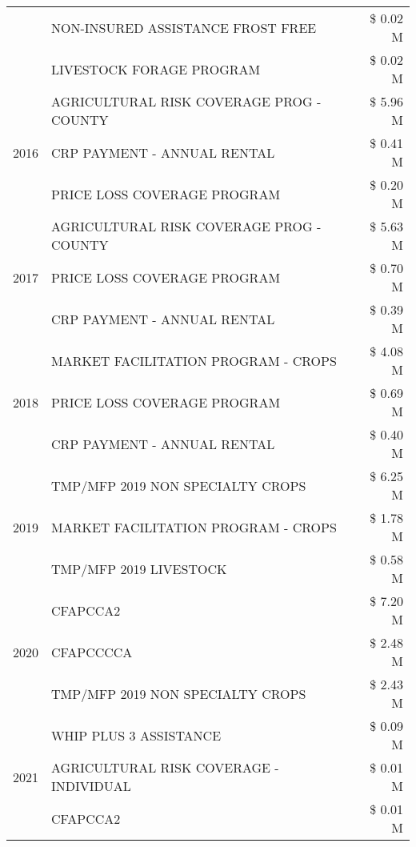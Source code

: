 \begin{tabular}{llr}
 & NON-INSURED ASSISTANCE FROST FREE & \$ 0.02 M \\
 & LIVESTOCK FORAGE PROGRAM & \$ 0.02 M \\
\cline{1-3}
\multirow[t]{3}{*}{2016} & AGRICULTURAL RISK COVERAGE PROG - COUNTY      & \$ 5.96 M \\
 & CRP PAYMENT - ANNUAL RENTAL                   & \$ 0.41 M \\
 & PRICE LOSS COVERAGE PROGRAM                   & \$ 0.20 M \\
\cline{1-3}
\multirow[t]{3}{*}{2017} & AGRICULTURAL RISK COVERAGE PROG - COUNTY & \$ 5.63 M \\
 & PRICE LOSS COVERAGE PROGRAM & \$ 0.70 M \\
 & CRP PAYMENT - ANNUAL RENTAL & \$ 0.39 M \\
\cline{1-3}
\multirow[t]{3}{*}{2018} & MARKET FACILITATION PROGRAM - CROPS & \$ 4.08 M \\
 & PRICE LOSS COVERAGE PROGRAM & \$ 0.69 M \\
 & CRP PAYMENT - ANNUAL RENTAL & \$ 0.40 M \\
\cline{1-3}
\multirow[t]{3}{*}{2019} & TMP/MFP 2019 NON SPECIALTY CROPS & \$ 6.25 M \\
 & MARKET FACILITATION PROGRAM - CROPS & \$ 1.78 M \\
 & TMP/MFP 2019 LIVESTOCK & \$ 0.58 M \\
\cline{1-3}
\multirow[t]{3}{*}{2020} & CFAPCCA2 & \$ 7.20 M \\
 & CFAPCCCCA & \$ 2.48 M \\
 & TMP/MFP 2019 NON SPECIALTY CROPS & \$ 2.43 M \\
\cline{1-3}
\multirow[t]{3}{*}{2021} & WHIP PLUS 3 ASSISTANCE & \$ 0.09 M \\
 & AGRICULTURAL RISK COVERAGE - INDIVIDUAL & \$ 0.01 M \\
 & CFAPCCA2 & \$ 0.01 M \\
\cline{1-3}
\bottomrule
\end{tabular}
